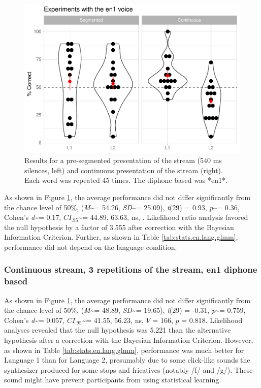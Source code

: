 \documentclass[]{article}
\newcommand{\T}{{\em t\/}}
\newcommand{\p}{{\em p\/}}
\newcommand{\M}{{\em M\/}}
\newcommand{\SD}{{\em SD\/}}
\newcommand{\D}{Cohen's {\em d\/}}
\newcommand{\CI}{$CI_{.95}$}
\begin{document}
\begin{figure}

{\centering \includegraphics[width=0.8\linewidth]{segmentation_recall_combined_files/figure-latex/stats-london-stats.3x.en.segm-cont.plot-1} 

}

\caption{Results for a pre-segmented presentation of the stream (540 ms silences, left) and continuous presentation of the stream (right). Each word was repeated 45 times. The diphone based was *en1*.}\label{fig:stats-london-stats.3x.en.segm-cont.plot}
\end{figure}

As shown in Figure \ref{fig:stats-london-stats.3x.en.segm-cont.plot},
the average performance did not differ significantly from the chance
level of 50\%, (\M\textasciitilde{}= 54.26, \SD\textasciitilde{}=
25.09), \T(29) = 0.93, \p\textasciitilde{}= 0.36, \D\textasciitilde{}=
0.17, \CI\textasciitilde{}= 44.89, 63.63, ns, . Likelihood ratio
analysis favored the null hypothesis by a factor of 3.555 after
correction with the Bayesian Information Criterion. Further, as shown in
Table \ref{tab:stats.en.lang.glmm}, performance did not depend on the
language condition.

\subsubsection{Continuous stream, 3 repetitions of the stream, en1
diphone
based}\label{continuous-stream-3-repetitions-of-the-stream-en1-diphone-based}

As shown in Figure \ref{fig:stats-london-stats.3x.en.segm-cont.plot},
the average performance did not differ significantly from the chance
level of 50\%, (\M\textasciitilde{}= 48.89, \SD\textasciitilde{}=
19.65), \T(29) = -0.31, \p\textasciitilde{}= 0.759, \D\textasciitilde{}=
0.057, \CI\textasciitilde{}= 41.55, 56.23, ns, \(V\) = 166, \(p\) =
0.818. Likelihood analyses revealed that the null hypothesis was 5.221
than the alternative hypothesis after a correction with the Bayesian
Information Criterion. However, as shown in Table
\ref{tab:stats.en.lang.glmm}, performance was much better for Language 1
than for Language 2, presumably due to some click-like sounds the
synthesizer produced for some stops and fricatives (notably /f/ and
/g/). These sound might have prevent participants from using statistical
learning.
\end{document}
